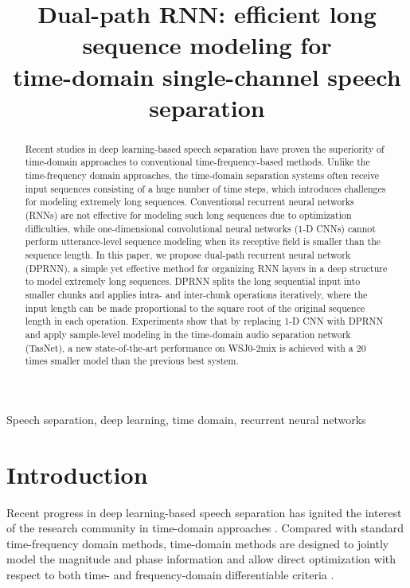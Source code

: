 \documentclass{article}
\title{Dual-path RNN: efficient long sequence modeling for\\time-domain single-channel speech separation}
\begin{document}
\ninept
\maketitle

\begin{abstract}
Recent studies in deep learning-based speech separation have proven the superiority of time-domain approaches to conventional time-frequency-based methods. Unlike the time-frequency domain approaches, the time-domain separation systems often receive input sequences consisting of a huge number of time steps, which introduces challenges for modeling extremely long sequences. Conventional recurrent neural networks (RNNs) are not effective for modeling such long sequences due to optimization difficulties, while one-dimensional convolutional neural networks (1-D CNNs) cannot perform utterance-level sequence modeling when its receptive field is smaller than the sequence length. In this paper, we propose dual-path recurrent neural network (DPRNN), a simple yet effective method for organizing RNN layers in a deep structure to model extremely long sequences. DPRNN splits the long sequential input into smaller chunks and applies intra- and inter-chunk operations iteratively, where the input length can be made proportional to the square root of the original sequence length in each operation. Experiments show that by replacing 1-D CNN with DPRNN and apply sample-level modeling in the time-domain audio separation network (TasNet), a new state-of-the-art performance on WSJ0-2mix is achieved with a 20 times smaller model than the previous best system. \end{abstract}

\begin{keywords}
Speech separation, deep learning, time domain, recurrent neural networks
\end{keywords}

\section{Introduction}
\label{sec:intro}
Recent progress in deep learning-based speech separation has ignited the interest of the research community in time-domain approaches \cite{luo2018tasnet, stoller2018wave, venkataramani2018end, luo2019conv, shi2019furcanext, bahmaninezhad2019comprehensive}. Compared with standard time-frequency domain methods, time-domain methods are designed to jointly model the magnitude and phase information and allow direct optimization with respect to both time- and frequency-domain differentiable criteria \cite{fu2018end, le2019sdr, luo2019fasnet}.
\end{document}
